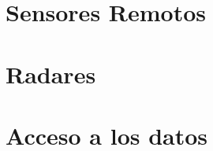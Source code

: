 \documentclass{beamer}
\begin{document}
\section{Sensores Remotos}



\section{Radares}

\section{Acceso a los datos}
\end{document}
